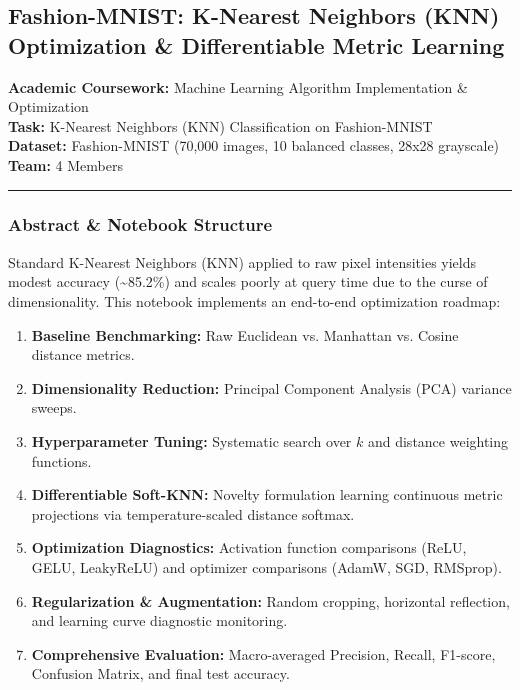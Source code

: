 \subsection*{Fashion-MNIST: K-Nearest Neighbors (KNN) Optimization \&
Differentiable Metric
Learning}\label{fashion-mnist-k-nearest-neighbors-knn-optimization--differentiable-metric-learning}

\textbf{Academic Coursework:} Machine Learning Algorithm Implementation
\& Optimization\\
\textbf{Task:} K-Nearest Neighbors (KNN) Classification on
Fashion-MNIST\\
\textbf{Dataset:} Fashion-MNIST (70,000 images, 10 balanced classes,
28x28 grayscale)\\
\textbf{Team:} 4 Members

\begin{center}\rule{0.5\linewidth}{0.5pt}\end{center}

\subsubsection*{Abstract \& Notebook
Structure}\label{abstract--notebook-structure}

Standard K-Nearest Neighbors (KNN) applied to raw pixel intensities
yields modest accuracy (\textasciitilde85.2\%) and scales poorly at
query time due to the curse of dimensionality. This notebook implements
an end-to-end optimization roadmap:

\begin{enumerate}
\tightlist
\item
  \textbf{Baseline Benchmarking:} Raw Euclidean vs. Manhattan vs. Cosine
  distance metrics.
\item
  \textbf{Dimensionality Reduction:} Principal Component Analysis (PCA)
  variance sweeps.
\item
  \textbf{Hyperparameter Tuning:} Systematic search over \(k\) and
  distance weighting functions.
\item
  \textbf{Differentiable Soft-KNN:} Novelty formulation learning
  continuous metric projections via temperature-scaled distance softmax.
\item
  \textbf{Optimization Diagnostics:} Activation function comparisons
  (ReLU, GELU, LeakyReLU) and optimizer comparisons (AdamW, SGD,
  RMSprop).
\item
  \textbf{Regularization \& Augmentation:} Random cropping, horizontal
  reflection, and learning curve diagnostic monitoring.
\item
  \textbf{Comprehensive Evaluation:} Macro-averaged Precision, Recall,
  F1-score, Confusion Matrix, and final test accuracy.
\end{enumerate}

